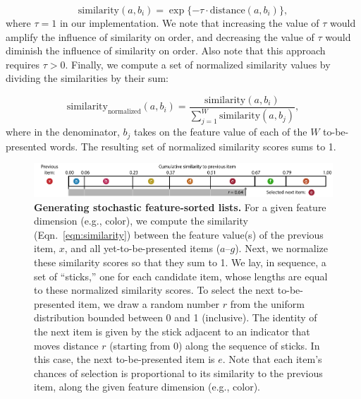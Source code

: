 \documentclass[11pt]{article}
\begin{document}
\begin{equation}
 \mathrm{similarity}(a, b_i) = \exp\{-\tau \cdot
\mathrm{distance}(a, b_i)\}, \label{eqn:similarity}
\end{equation}
where $\tau = 1$ in our implementation. We note that increasing the value of
$\tau$ would amplify the influence of similarity on order, and decreasing the
value of $\tau$ would diminish the influence of similarity on order. Also note
that this approach requires $\tau > 0$. Finally, we compute a set of
normalized similarity values by dividing the similarities by their sum:

\begin{equation}
\mathrm{similarity}_{\mathrm{normalized}}(a, b_i) = \frac{\mathrm{similarity}(a,
b_i)}{\sum_{j=1}^W \mathrm{similarity}(a, b_j)},
\end{equation}
where in the denominator, $b_j$ takes on the feature value of each of the $W$
to-be-presented words. The resulting set of normalized similarity scores sums
to 1.

\begin{figure}[tp]
    \centering
        \includegraphics[width=\textwidth]{figures/stick}

\caption{\textbf{Generating stochastic feature-sorted lists.} For a given
feature dimension (e.g., color), we compute the similarity
(Eqn.~\ref{eqn:similarity}) between the feature value(s) of the previous item,
$x$, and all yet-to-be-presented items ($a$--$g$). Next, we normalize these
similarity scores so that they sum to 1. We lay, in sequence, a set of
``sticks,'' one for each candidate item, whose lengths are equal to these
normalized similarity scores. To select the next to-be-presented item, we draw
a random number $r$ from the uniform distribution bounded between 0 and 1
(inclusive). The identity of the next item is given by the stick adjacent to an
indicator that moves distance $r$ (starting from 0) along the sequence of
sticks. In this case, the next to-be-presented item is $e$. Note that each
item's chances of selection is proportional to its similarity to the previous
item, along the given feature dimension (e.g., color).} \label{fig:stick}

\end{figure}
\end{document}
